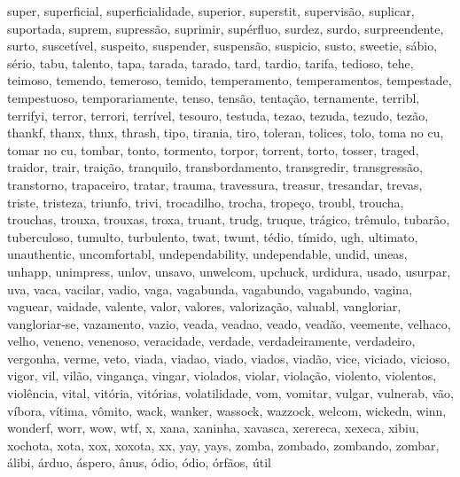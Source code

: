 super, superficial, superficialidade, superior, superstit, supervisão, suplicar, suportada, suprem, supressão, suprimir, supérfluo, surdez, surdo, surpreendente, surto, suscetível, suspeito, suspender, suspensão, suspicio, susto, sweetie, sábio, sério, tabu, talento, tapa, tarada, tarado, tard, tardio, tarifa, tedioso, tehe, teimoso, temendo, temeroso, temido, temperamento, temperamentos, tempestade, tempestuoso, temporariamente, tenso, tensão, tentação, ternamente, terribl, terrifyi, terror, terrori, terrível, tesouro, testuda, tezao, tezuda, tezudo, tezão, thankf, thanx, thnx, thrash, tipo, tirania, tiro, toleran, tolices, tolo, toma no cu, tomar no cu, tombar, tonto, tormento, torpor, torrent, torto, tosser, traged, traidor, trair, traição, tranquilo, transbordamento, transgredir, transgressão, transtorno, trapaceiro, tratar, trauma, travessura, treasur, tresandar, trevas, triste, tristeza, triunfo, trivi, trocadilho, trocha, tropeço, troubl, troucha, trouchas, trouxa, trouxas, troxa, truant, trudg, truque, trágico, trêmulo, tubarão, tuberculoso, tumulto, turbulento, twat, twunt, tédio, tímido, ugh, ultimato, unauthentic, uncomfortabl, undependability, undependable, undid, uneas, unhapp, unimpress, unlov, unsavo, unwelcom, upchuck, urdidura, usado, usurpar, uva, vaca, vacilar, vadio, vaga, vagabunda, vagabundo, vagabundo, vagina, vaguear, vaidade, valente, valor, valores, valorização, valuabl, vangloriar, vangloriar-se, vazamento, vazio, veada, veadao, veado, veadão, veemente, velhaco, velho, veneno, venenoso, veracidade, verdade, verdadeiramente, verdadeiro, vergonha, verme, veto, viada, viadao, viado, viados, viadão, vice, viciado, vicioso, vigor, vil, vilão, vingança, vingar, violados, violar, violação, violento, violentos, violência, vital, vitória, vitórias, volatilidade, vom, vomitar, vulgar, vulnerab, vão, víbora, vítima, vômito, wack, wanker, wassock, wazzock, welcom, wickedn, winn, wonderf, worr, wow, wtf, x, xana, xaninha, xavasca, xerereca, xexeca, xibiu, xochota, xota, xox, xoxota, xx, yay, yays, zomba, zombado, zombando, zombar, álibi, árduo, áspero, ânus, ódio, ódio, órfãos, útil 

\begin{comment}
\apendice{APÊNDICE B}
\addcontentsline{toc}{section}{APÊNDICE B}

Contém materiais de leitura opcional e complementar produzidos pelo autor da pesquisa, incluindo os instrumentos de coleta de dados a serem utilizados. Se não for utilizada, esta seção deve ser removida já na versão 1 do projeto.
\end{comment}